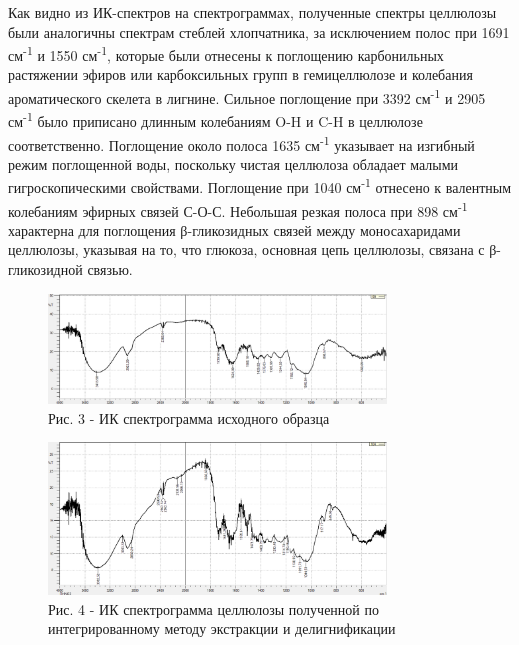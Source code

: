 \begin{multicols}{2}
Как видно из ИК-спектров на спектрограммах, полученные спектры целлюлозы
были аналогичны спектрам стеблей хлопчатника, за исключением полос при
1691 см\textsuperscript{-1} и 1550 см\textsuperscript{-1}, которые были
отнесены к поглощению карбонильных растяжении эфиров или карбоксильных
групп в гемицеллюлозе и колебания ароматического скелета в лигнине.
Сильное поглощение при 3392 см\textsuperscript{-1} и 2905
см\textsuperscript{-1} было приписано длинным колебаниям O-H и C-H в
целлюлозе соответственно. Поглощение около полоса 1635
см\textsuperscript{-1} указывает на изгибный режим поглощенной воды,
поскольку чистая целлюлоза обладает малыми гигроскопическими свойствами.
Поглощение при 1040 см\textsuperscript{-1} отнесено к валентным
колебаниям эфирных связей С-О-С. Небольшая резкая полоса при 898
см\textsuperscript{-1} характерна для поглощения β-гликозидных связей
между моносахаридами целлюлозы, указывая на то, что глюкоза, основная
цепь целлюлозы, связана с β-гликозидной связью.
\end{multicols}

\begin{figure}[H]
	\centering
	\includegraphics[width=0.8\textwidth]{assets/78}
	\caption*{Рис. 3 - ИК спектрограмма исходного образца}
\end{figure}

\begin{figure}[H]
	\centering
	\includegraphics[width=0.8\textwidth]{assets/79}
	\caption*{Рис. 4 - ИК спектрограмма целлюлозы полученной по интегрированному методу экстракции и делигнификации}
\end{figure}

